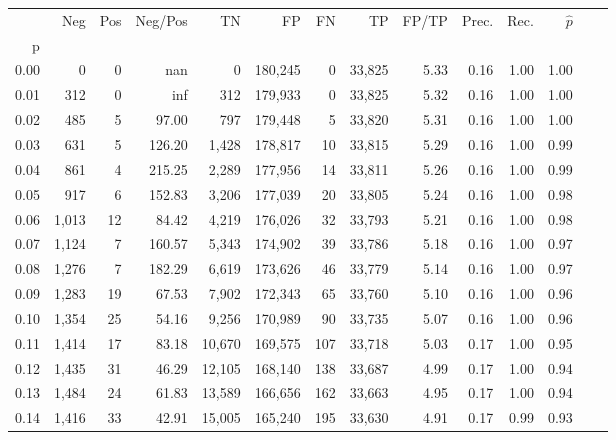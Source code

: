\begin{tabular}{rrrrrrrrrrrrrr}
\toprule
{} &    Neg &    Pos & Neg/Pos &       TN &       FP &      FN &      TP & FP/TP & Prec. &  Rec. & $\hat{p}$ \\
p    &        &        &         &          &          &         &         &       &       &       &           \\
\midrule
0.00 &      0 &      0 &     nan &        0 &  180,245 &       0 &  33,825 &  5.33 &  0.16 &  1.00 &      1.00 \\
0.01 &    312 &      0 &     inf &      312 &  179,933 &       0 &  33,825 &  5.32 &  0.16 &  1.00 &      1.00 \\
0.02 &    485 &      5 &   97.00 &      797 &  179,448 &       5 &  33,820 &  5.31 &  0.16 &  1.00 &      1.00 \\
0.03 &    631 &      5 &  126.20 &    1,428 &  178,817 &      10 &  33,815 &  5.29 &  0.16 &  1.00 &      0.99 \\
0.04 &    861 &      4 &  215.25 &    2,289 &  177,956 &      14 &  33,811 &  5.26 &  0.16 &  1.00 &      0.99 \\
0.05 &    917 &      6 &  152.83 &    3,206 &  177,039 &      20 &  33,805 &  5.24 &  0.16 &  1.00 &      0.98 \\
0.06 &  1,013 &     12 &   84.42 &    4,219 &  176,026 &      32 &  33,793 &  5.21 &  0.16 &  1.00 &      0.98 \\
0.07 &  1,124 &      7 &  160.57 &    5,343 &  174,902 &      39 &  33,786 &  5.18 &  0.16 &  1.00 &      0.97 \\
0.08 &  1,276 &      7 &  182.29 &    6,619 &  173,626 &      46 &  33,779 &  5.14 &  0.16 &  1.00 &      0.97 \\
0.09 &  1,283 &     19 &   67.53 &    7,902 &  172,343 &      65 &  33,760 &  5.10 &  0.16 &  1.00 &      0.96 \\
0.10 &  1,354 &     25 &   54.16 &    9,256 &  170,989 &      90 &  33,735 &  5.07 &  0.16 &  1.00 &      0.96 \\
0.11 &  1,414 &     17 &   83.18 &   10,670 &  169,575 &     107 &  33,718 &  5.03 &  0.17 &  1.00 &      0.95 \\
0.12 &  1,435 &     31 &   46.29 &   12,105 &  168,140 &     138 &  33,687 &  4.99 &  0.17 &  1.00 &      0.94 \\
0.13 &  1,484 &     24 &   61.83 &   13,589 &  166,656 &     162 &  33,663 &  4.95 &  0.17 &  1.00 &      0.94 \\
0.14 &  1,416 &     33 &   42.91 &   15,005 &  165,240 &     195 &  33,630 &  4.91 &  0.17 &  0.99 &      0.93 \\

\end{tabular}
